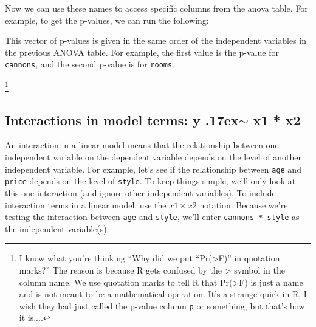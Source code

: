 \documentclass{tufte-book}\usepackage[]{graphicx}\usepackage[]{color}
\makeatletter
\newcommand{\hlstr}[1]{\textcolor[rgb]{0.192,0.494,0.8}{#1}}%
\newcommand{\hlopt}[1]{\textcolor[rgb]{0,0,0}{#1}}%
\newcommand{\hlstd}[1]{\textcolor[rgb]{0.345,0.345,0.345}{#1}}%
\newcommand{\hlkwd}[1]{\textcolor[rgb]{0.737,0.353,0.396}{\textbf{#1}}}%
\newenvironment{kframe}{%
 \def\at@end@of@kframe{}%
 \ifinner\ifhmode%
  \def\at@end@of@kframe{\end{minipage}}%
  \begin{minipage}{\columnwidth}%
 \fi\fi%
 \def\FrameCommand##1{\hskip\@totalleftmargin \hskip-\fboxsep
 \colorbox{shadecolor}{##1}\hskip-\fboxsep
     \hskip-\linewidth \hskip-\@totalleftmargin \hskip\columnwidth}%
 \MakeFramed {\advance\hsize-\width
   \@totalleftmargin\z@ \linewidth\hsize
   \@setminipage}}%
 {\par\unskip\endMakeFramed%
 \at@end@of@kframe}
\newenvironment{knitrout}{}{} %
\makeatother
\begin{document}
\begin{footnotesize}
Now we can use these names to access specific columns from the anova table. For example, to get the p-values, we can run the following:


This vector of p-values is given in the same order of the independent variables in the previous ANOVA table. For example, the first value is the p-value for \texttt{cannons}, and the second p-value is for \texttt{rooms}.


\footnote{I know what you're thinking ``Why did we put ``Pr(>F)'' in quotation marks?'' The reason is because R gets confused by the > symbol in the column name. We use quotation marks to tell R that Pr(>F) is just a name and is not meant to be a mathematical operation. It's a strange quirk in R, I wish they had just called the p-value column \texttt{p} or something, but that's how it is....}


\subsection{Interactions in model terms: y {\raise.17ex\hbox{$\scriptstyle\sim$}} x1 * x2}

An interaction in a linear model means that the relationship between one independent variable on the dependent variable depends on the level of another independent variable. For example, let's see if the relationship between \texttt{age} and \texttt{price} depends on the level of \texttt{style}. To keep things simple, we'll only look at this one interaction (and ignore other independent variables). To include interaction terms in a linear model, use the $x1 \times x2$ notation. Because we're testing the interaction between \texttt{age} and \texttt{style}, we'll enter \texttt{cannons * style} as the independent variable(s):




\end{footnotesize}
\end{document}
